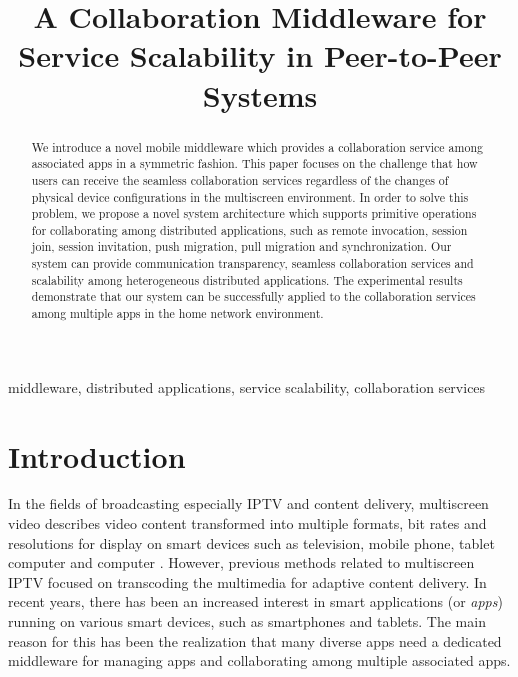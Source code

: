 \documentclass[conference]{IEEEtran}
\begin{document}
    \title{A Collaboration Middleware for Service Scalability in Peer-to-Peer Systems }

    \author{
    }

    \maketitle

\begin{abstract}
We introduce a novel mobile middleware which provides a collaboration service among associated apps in a symmetric fashion.
This paper focuses on the challenge that how users can  receive the seamless collaboration services regardless of the changes of physical device configurations in the multiscreen environment.
In order to solve this problem, we propose a novel system architecture which supports primitive operations for collaborating among distributed applications, such as remote invocation, session join, session invitation,  push migration, pull migration and synchronization.
Our system can provide communication transparency, seamless collaboration services and scalability among heterogeneous distributed applications.
The experimental results demonstrate that our system can be successfully applied to the collaboration services among multiple apps in the home network environment.
\end{abstract}

    \begin{IEEEkeywords}
    middleware, distributed applications, service scalability, collaboration services
    \end{IEEEkeywords}

\section{Introduction}
In the fields of broadcasting especially IPTV and content delivery, multiscreen video describes video content transformed into multiple formats, bit rates and resolutions for display on smart devices such as television, mobile phone, tablet computer and computer \cite{Lucent2011}.
However, previous methods related to multiscreen IPTV focused on transcoding the multimedia for adaptive content delivery. 
In recent years, there has been an increased interest in smart applications (or \textit{apps}) running on various smart devices, such as smartphones and tablets. 
The main reason for this has been the realization that many diverse apps need a dedicated middleware for managing apps and collaborating among multiple associated apps. 
\end{document}
